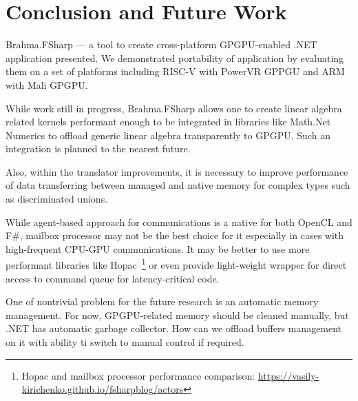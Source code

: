 \section{Conclusion and Future Work}

Brahma.FSharp --- a tool to create cross-platform GPGPU-enabled .NET application presented. 
We demonstrated portability of application by evaluating them on a set of platforms including RISC-V with PowerVR GPPGU and ARM with Mali GPGPU.

While work still in progress, Brahma.FSharp allows one to create linear algebra related kernels performant enough to be integrated in libraries like Math.Net Numerics to offload generic linear algebra transparently to GPGPU.
Such an integration is planned to the nearest future.

Also, within the translator improvements, it is necessary to improve performance of data transferring between managed and native memory for complex types such as discriminated unions.

While agent-based approach for communications is a native for both OpenCL and F\#, mailbox processor may not be the best choice for it especially in cases with high-frequent CPU-GPU communications.
It may be better to use more performant libraries like Hopac~\footnote{Hopac and mailbox processor performance comparison: \url{https://vasily-kirichenko.github.io/fsharpblog/actors}} or even provide light-weight wrapper for direct access to command queue for latency-critical code.

One of nontrivial problem for the future research is an automatic memory management.
For now, GPGPU-related memory should be cleaned manually, but .NET has automatic garbage collector. 
How can we offload buffers management on it with ability ti switch to manual control if required. 


